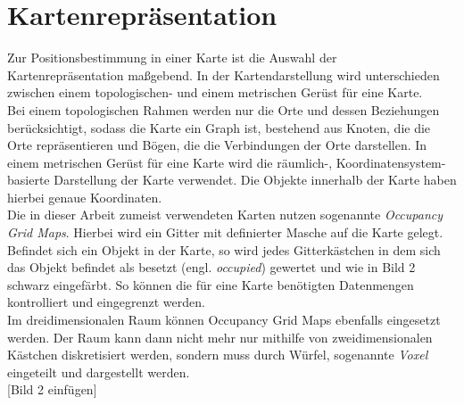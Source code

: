 \section{Kartenrepräsentation}\label{sec:Kartenrepräsentation}
Zur Positionsbestimmung in einer Karte ist die Auswahl der Kartenrepräsentation maßgebend. In der Kartendarstellung wird unterschieden zwischen einem topologischen- und einem metrischen Gerüst für eine Karte.\\
Bei einem topologischen Rahmen werden nur die Orte und dessen Beziehungen berücksichtigt, sodass die Karte ein Graph ist, bestehend aus Knoten, die die Orte repräsentieren und Bögen, die die Verbindungen der Orte darstellen. In einem metrischen Gerüst für eine Karte wird die räumlich-, Koordinatensystem-basierte Darstellung der Karte verwendet. Die Objekte innerhalb der Karte haben hierbei genaue Koordinaten.\\
Die in dieser Arbeit zumeist verwendeten Karten nutzen sogenannte \textit{Occupancy Grid Maps}. Hierbei wird ein Gitter mit definierter Masche auf die Karte gelegt. Befindet sich ein Objekt in der Karte, so wird jedes Gitterkästchen in dem sich das Objekt befindet als besetzt (engl. \textit{occupied}) gewertet und wie in Bild 2 schwarz eingefärbt. So können die für eine Karte benötigten Datenmengen kontrolliert und eingegrenzt werden.\\
Im dreidimensionalen Raum können Occupancy Grid Maps ebenfalls eingesetzt werden. Der Raum kann dann nicht mehr nur mithilfe von zweidimensionalen Kästchen diskretisiert werden, sondern muss durch Würfel, sogenannte \textit{Voxel} eingeteilt und dargestellt werden.\\

[Bild 2 einfügen]
